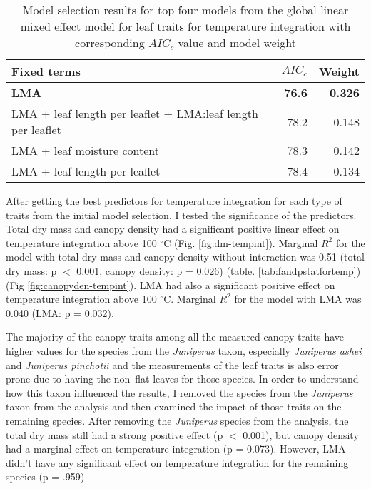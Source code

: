 \documentclass[12pt]{report}
\begin{document}

\begin{table}
  \centering
  \caption{Model selection results for top four models from the global linear
    mixed effect model for leaf traits for temperature integration with
    corresponding $AIC_{c}$ value and model weight}
  \begin{tabular}{lrr}
    \toprule
    \textbf{Fixed terms} & $AIC_{c}$ & \textbf{Weight}\\
    \midrule
    \textbf{LMA} & \textbf{76.6} & \textbf{0.326} \\
    LMA + leaf length per leaflet + LMA:leaf length per leaflet & 78.2     & 0.148    \\
    LMA + leaf moisture content                                 & 78.3     & 0.142    \\
    LMA + leaf length per leaflet                               & 78.4     & 0.134    \\
    \bottomrule
  \end{tabular}
  \label{tab:leaf_models}
\end{table}




After getting the best predictors for temperature integration for each type of traits from the initial model selection,
I tested the significance of the predictors. Total dry mass and canopy density had a significant positive linear effect %
on temperature integration above 100 $^{\circ}$C (Fig. \ref{fig:dm-tempint}). Marginal $R^2$ for the model with total dry mass and canopy density without interaction was 0.51 (total dry mass: p $<$ 0.001, canopy density: p = 0.026) (table. \ref{tab:fandpstatfortemp}) (Fig \ref{fig:canopyden-tempint}). LMA had also a significant positive effect on temperature integration above 100 $^{\circ}$C. Marginal $R^2$ for the model with LMA was 0.040 (LMA: p = 0.032). 

The majority of the canopy traits among all the measured canopy traits have higher values for the species from the \emph{Juniperus} taxon, especially \emph{Juniperus ashei} and \emph{Juniperus pinchotii} and the measurements of the leaf traits is also error prone due to having the non--flat leaves for those species. In order to understand how this taxon influenced the results, I removed the species from the \emph{Juniperus} taxon from the analysis and then examined the impact of those traits on the remaining species. After removing the \emph{Juniperus} species from the analysis, the total dry mass still had a strong positive effect (p $<$ 0.001), but canopy density had a marginal effect on temperature integration (p = 0.073). However, LMA didn't have any significant effect on temperature integration for the remaining species (p = .959) 
\end{document}
